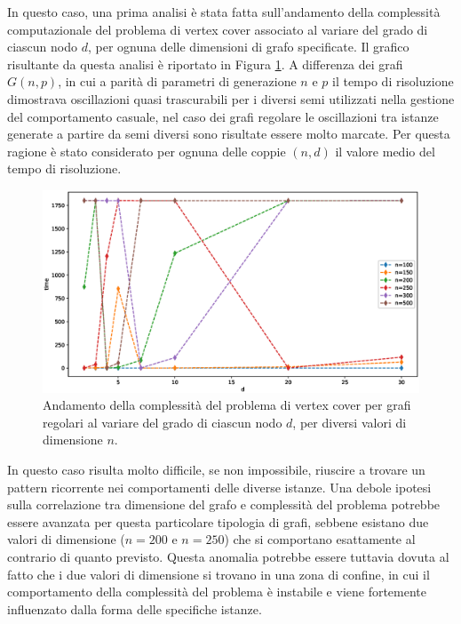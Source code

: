 In questo caso, una prima analisi è stata fatta sull'andamento della complessità computazionale del problema di vertex cover associato al variare del grado di ciascun nodo $d$, per ognuna delle dimensioni di grafo specificate. Il grafico risultante da questa analisi è riportato in Figura \ref{fig:rrgd}. A differenza dei grafi $G(n,p)$, in cui a parità di parametri di generazione $n$ e $p$ il tempo di risoluzione dimostrava oscillazioni quasi trascurabili per i diversi semi utilizzati nella gestione del comportamento casuale, nel caso dei grafi regolare le oscillazioni tra istanze generate a partire da semi diversi sono risultate essere molto marcate. Per questa ragione è stato considerato per ognuna delle coppie $(n,d)$ il valore medio del tempo di risoluzione. 
\vspace{-1cm}
\begin{figure}[h!]
     \centering
       \includegraphics[scale=0.5]{images/rrg-d.eps}
       \caption{Andamento della complessità del problema di vertex cover per grafi regolari al variare del grado di ciascun nodo $d$, per diversi valori di dimensione $n$.}
        \label{fig:rrgd}
\end{figure}

In questo caso risulta molto difficile, se non impossibile, riuscire a trovare un pattern ricorrente nei comportamenti delle diverse istanze. Una debole ipotesi sulla correlazione tra dimensione del grafo e complessità del problema potrebbe essere avanzata per questa particolare tipologia di grafi, sebbene esistano due valori di dimensione ($n=200$ e $n=250$) che si comportano esattamente al contrario di quanto previsto. Questa anomalia potrebbe essere tuttavia dovuta al fatto che i due valori di dimensione si trovano in una zona di confine, in cui il comportamento della complessità del problema è instabile e viene fortemente influenzato dalla forma delle specifiche istanze.


